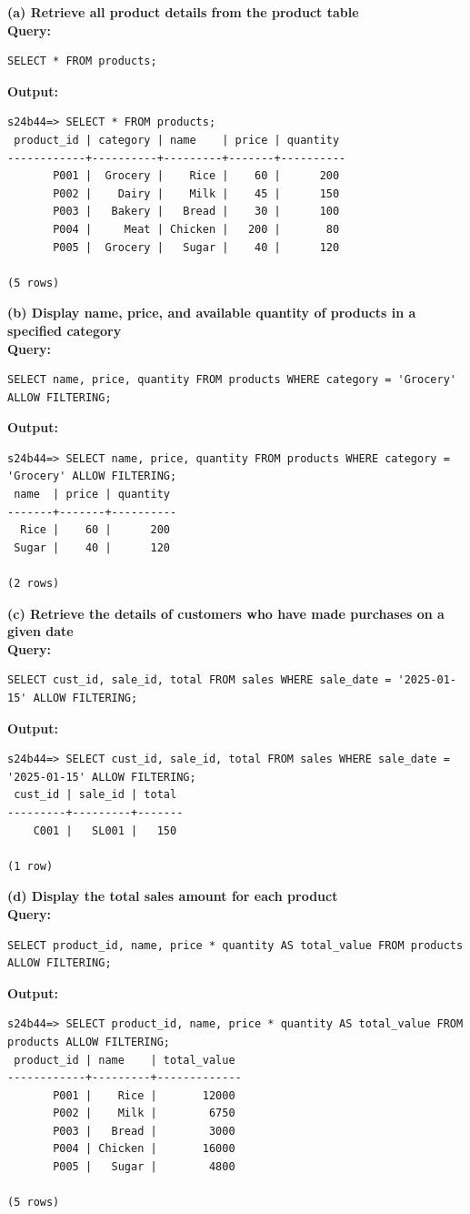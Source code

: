 \documentclass[12pt, a4paper]{article}
\begin{document}
\textbf{(a) Retrieve all product details from the product table}\\
\textbf{Query:}
\begin{lstlisting}
SELECT * FROM products;
\end{lstlisting}
\textbf{Output:}
\begin{lstlisting}[style=terminal]
s24b44=> SELECT * FROM products;
 product_id | category | name    | price | quantity
------------+----------+---------+-------+----------
       P001 |  Grocery |    Rice |    60 |      200
       P002 |    Dairy |    Milk |    45 |      150
       P003 |   Bakery |   Bread |    30 |      100
       P004 |     Meat | Chicken |   200 |       80
       P005 |  Grocery |   Sugar |    40 |      120

(5 rows)
\end{lstlisting}

\textbf{(b) Display name, price, and available quantity of products in a specified category}\\
\textbf{Query:}
\begin{lstlisting}
SELECT name, price, quantity FROM products WHERE category = 'Grocery' ALLOW FILTERING;
\end{lstlisting}
\textbf{Output:}
\begin{lstlisting}[style=terminal]
s24b44=> SELECT name, price, quantity FROM products WHERE category = 'Grocery' ALLOW FILTERING;
 name  | price | quantity
-------+-------+----------
  Rice |    60 |      200
 Sugar |    40 |      120

(2 rows)
\end{lstlisting}

\textbf{(c) Retrieve the details of customers who have made purchases on a given date}\\
\textbf{Query:}
\begin{lstlisting}
SELECT cust_id, sale_id, total FROM sales WHERE sale_date = '2025-01-15' ALLOW FILTERING;
\end{lstlisting}
\textbf{Output:}
\begin{lstlisting}[style=terminal]
s24b44=> SELECT cust_id, sale_id, total FROM sales WHERE sale_date = '2025-01-15' ALLOW FILTERING;
 cust_id | sale_id | total
---------+---------+-------
    C001 |   SL001 |   150

(1 row)
\end{lstlisting}

\textbf{(d) Display the total sales amount for each product}\\
\textbf{Query:}
\begin{lstlisting}
SELECT product_id, name, price * quantity AS total_value FROM products ALLOW FILTERING;
\end{lstlisting}
\textbf{Output:}
\begin{lstlisting}[style=terminal]
s24b44=> SELECT product_id, name, price * quantity AS total_value FROM products ALLOW FILTERING;
 product_id | name    | total_value
------------+---------+-------------
       P001 |    Rice |       12000
       P002 |    Milk |        6750
       P003 |   Bread |        3000
       P004 | Chicken |       16000
       P005 |   Sugar |        4800

(5 rows)
\end{lstlisting}
\end{document}
